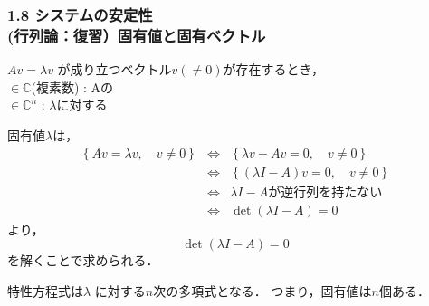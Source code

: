 \begin{frame}[t]
\frametitle{1.8 システムの安定性 \\
(行列論：復習）固有値と固有ベクトル}
$A v = \lambda v$
が成り立つベクトル$v (\neq 0)$が存在するとき，\\
\Blue{$\lambda$} $\in {\mathbb C}$(複素数) : Aの\\
 $\in {\mathbb C}^n$
 : $\lambda$に対する

固有値$\lambda$は，
\[
 \begin{array}{rcl}
  \left\{A v = \lambda v, \quad v \neq 0\right\}
   &\Leftrightarrow& \left\{\lambda v - Av = 0, \quad v \neq 0\right\} \\
   &\Leftrightarrow& \left\{(\lambda I - A)v = 0, \quad v \neq 0\right\} \\
  &\Leftrightarrow& \lambda I - A \text{が逆行列を持たない} \\
  &\Leftrightarrow& \det(\lambda I - A) = 0
 \end{array}
\]
より，
\begin{equation}
  \det(\lambda I - A) = 0
\end{equation}
を解くことで求められる．

特性方程式は$\lambda$ に対する$n$次の多項式となる．
つまり，固有値は$n$個ある．
\end{frame}


